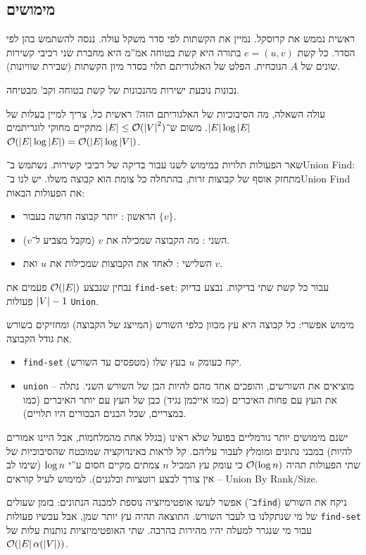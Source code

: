 \documentclass[]{../../../../tex/classes/styledArticle}
\begin{document}
	
	\subsection*{מימושים}
	ראשית נממש את קרוסקל. 
	נמיין את הקשתות לפי סדר משקל עולה. ננסה להשתמש בהן לפי הסדר. כל קשת $e = (u, v)$ בתורה היא קשת בטוחה אמ''מ היא מחברת שני רכיבי קשירות שונים של $A$ הנוכחית. הפלט של האלגוריתם תלוי בסדר מיון הקשתות (שבירת שוויונות). 
	
	נכונות נובעת ישירות מהנכונות של קשת בטוחה וקב' מבטיחה. 
	
	עולה השאלה, מה הסיבוכיות של האלגוריתם הזה? ראשית כל, צריך למיין בעלות של $\left \lvert E \right \rvert\log\left \lvert E \right \rvert$. משום ש־$\left \lvert E \right \rvert \le \mathcal{O}(\left \lvert V \right \rvert^{2})$ מתקיים מחוקי לוגריתמים $\mathcal{O}(\left \lvert E \right \rvert \log \left \lvert E \right \rvert) = \mathcal{O}(\left \lvert E \right \rvert \log \left \lvert V \right \rvert)$. 
	
	שאר הפעולות תלויות במימוש לשנו עבור בדיקה של רכיבי קשירות. נשתמש ב־Union Find: מתחזק אוסף של קבוצות זרות, בהתחלה כל צומת הוא קבוצה משלו. יש לנו ב־Union Find את הפעולות הבאות: 
	\begin{itemize}
		\item הראשון : יותר קבוצה חדשה בעבור $\{v\}$. 
		\item השני : מה הקבוצה שמכילה את $v$ (מקבל מצביע ל־$v$). 
		\item השלישי : לאחד את הקבוצות שמכילות את $u$ ואת $v$. 
	\end{itemize}
	נבחין שנבצע $\mathcal{O}(\left \lvert E \right \rvert)$ פעמים את \texttt{find-set}: עבור כל קשת שתי בדיקות. נבצע בדיוק $\left \lvert V \right \rvert - 1$ פעולות \texttt{Union}. 
	
	מימוש אפשרי: כל קבוצה היא עץ מכוון כלפי השורש (המייצג של הקבוצה) ומחזיקים בשורש את גודל הקבוצה. 
	\begin{itemize}
		\item \texttt{find-set} יקח כעומק $u$ בעץ שלו (מטפסים עד השורש). 
		\item \texttt{union} – מוציאים את השורשים, והופכים אחד מהם להיות הבן של השורש השני. נתלה את העץ עם פחות האיברים (כמו אייכמן נגיד) כבן של העץ עם יותר האיברים (כמו במצריים, שכל הבנים הבכורים היו תלויים). 
	\end{itemize}
	ישנם מימושים יותר נורמליים בפועל שלא ראינו (בגלל אחת מהמלחמות, אבל היינו אמורים להיות) במבני נתונים ומומלץ לעבור עליהם. קל לראות באינדוקציה שמובטח שהסיבוכיות של שתי הפעולות תהיה $\mathcal{O}(\log n)$ כי עומק עץ המכיל $n$ צמתים מקיים חסום ע''י $\log n$ (שימו לב – אין צורך לבצע רוטציות ובלגנים). למימוש לעיל קוראים Union By Rank/Size. 
	
	אפשר לעשו אופטימיזציה נוספת למבנה הנתונים: בזמן שעולים (ב־\texttt{find}) ניקח את השורש של מי שנתקלנו בו לעבר השורש. התוצאה תהיה עץ יותר שמן, אבל עכשיו פעולות \texttt{find-set} עבור מי שנגרר למעלה יהיו מהירות בהרבה. שתי האופטימיזציות נותנות עלות של $\mathcal{O}(\left \lvert E \right \rvert \alpha(\left \lvert V \right \rvert))$. 
	
\end{document}
